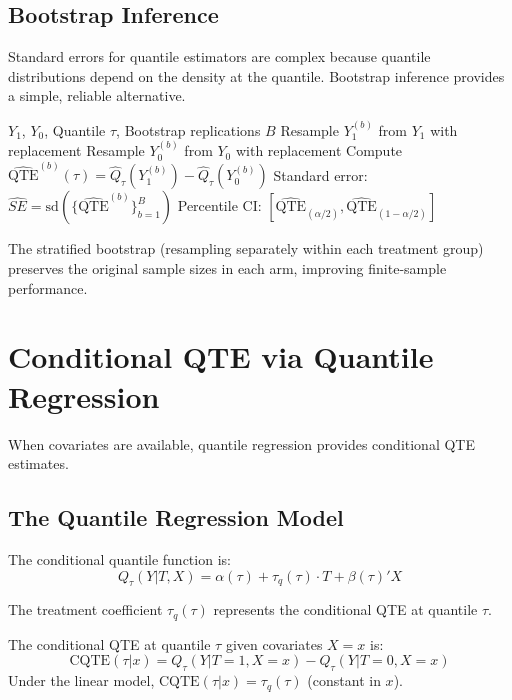 \subsection{Bootstrap Inference}

Standard errors for quantile estimators are complex because quantile distributions depend on the density at the quantile. Bootstrap inference provides a simple, reliable alternative.

\begin{algorithm}[H]
\caption{Stratified Bootstrap for QTE}
\label{alg:bootstrap-qte}
\begin{algorithmic}[1]
\REQUIRE $Y_1$, $Y_0$, Quantile $\tau$, Bootstrap replications $B$
    \STATE Resample $Y_1^{(b)}$ from $Y_1$ with replacement
    \STATE Resample $Y_0^{(b)}$ from $Y_0$ with replacement
    \STATE Compute $\widehat{\text{QTE}}^{(b)}(\tau) = \hat{Q}_\tau(Y_1^{(b)}) - \hat{Q}_\tau(Y_0^{(b)})$
\ENDFOR
\STATE Standard error: $\widehat{SE} = \text{sd}(\{\widehat{\text{QTE}}^{(b)}\}_{b=1}^B)$
\STATE Percentile CI: $[\widehat{\text{QTE}}_{(\alpha/2)}, \widehat{\text{QTE}}_{(1-\alpha/2)}]$
\end{algorithmic}
\end{algorithm}

The stratified bootstrap (resampling separately within each treatment group) preserves the original sample sizes in each arm, improving finite-sample performance.

\section{Conditional QTE via Quantile Regression}
\label{sec:qte-conditional}

When covariates are available, quantile regression \citep{koenker1978regression} provides conditional QTE estimates.

\subsection{The Quantile Regression Model}

The conditional quantile function is:
\[
Q_\tau(Y | T, X) = \alpha(\tau) + \tau_q(\tau) \cdot T + \beta(\tau)' X
\]

The treatment coefficient $\tau_q(\tau)$ represents the conditional QTE at quantile $\tau$.

\begin{definition}
The conditional QTE at quantile $\tau$ given covariates $X = x$ is:
\[
\text{CQTE}(\tau | x) = Q_\tau(Y | T=1, X=x) - Q_\tau(Y | T=0, X=x)
\]
Under the linear model, $\text{CQTE}(\tau | x) = \tau_q(\tau)$ (constant in $x$).
\end{definition}

